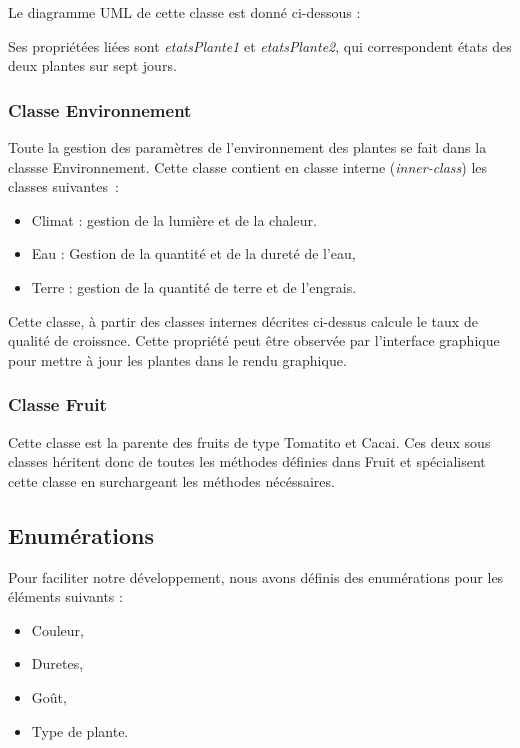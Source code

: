 \documentclass[a4paper,10pt]{article}
\begin{document}
Le diagramme UML de cette classe est donné ci-dessous :

Ses propriétées liées sont \textit{etatsPlante1} et \textit{etatsPlante2}, qui correspondent états des deux plantes
sur sept jours.


\subsubsection{Classe Environnement}
Toute la gestion des paramètres de l'environnement des plantes se fait dans la classse Environnement.
Cette classe contient en classe interne (\textit{inner-class}) les classes suivantes~:
\begin{itemize}
	\item Climat : gestion de la lumière et de la chaleur.
	\item Eau : Gestion de la quantité et de la dureté de l'eau,
	\item Terre : gestion de la quantité de terre et de l'engrais.
\end{itemize}

Cette classe, à partir des classes internes décrites ci-dessus calcule le taux de qualité de croissnce. Cette propriété peut être observée par l'interface graphique pour mettre à jour les plantes dans le rendu graphique.


\subsubsection{Classe Fruit}

Cette classe est la parente des fruits de type Tomatito et Cacai. Ces deux sous classes héritent donc de toutes les méthodes
définies dans Fruit et spécialisent cette classe en surchargeant les méthodes nécéssaires.

\subsection{Enumérations}

Pour faciliter notre développement, nous avons définis des enumérations pour les éléments suivants :
\begin{itemize}
 \item Couleur,
 \item Duretes,
 \item Goût,
 \item Type de plante.
\end{itemize}
\end{document}
